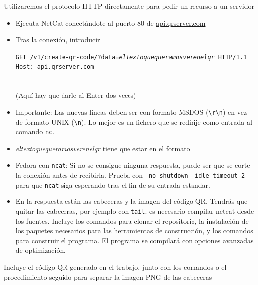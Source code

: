 \begin{homeworkProblem}

  

  
  Utilizaremos el protocolo HTTP directamente para pedir un recurso a un servidor
  \begin{itemize}
  \item Ejecuta NetCat conectándote al puerto 80 de \url{api.qrserver.com}
  \item Tras la conexión, introducir
    \begin{cuadrito}
      \texttt{GET /v1/create-qr-code/?data=\textit{eltextoquequeramosverenelqr} HTTP/1.1} \\
      \texttt{Host: api.qrserver.com} \\
      \\
      \\
      (Aquí hay que darle al Enter dos veces)
    \end{cuadrito}
  \item Importante: Las nuevas líneas deben ser con formato MSDOS (\texttt{\textbackslash r\textbackslash n}) en vez de formato UNIX (\texttt{\textbackslash n}). Lo mejor es un fichero que se redirije como entrada al comando \texttt{nc}.
  \item \textit{eltextoquequeramosverenelqr} tiene que estar en el formato 
  \item Fedora con \texttt{ncat}: Si no se consigue ninguna respuesta, puede ser que se corte la conexión antes de recibirla. Prueba con \texttt{--no-shutdown --idle-timeout 2} para que \texttt{ncat} siga esperando tras el fin de su entrada estándar.
  \item En la respuesta están las cabeceras y la imagen del código QR. Tendrás que quitar las cabeceras, por ejemplo con \texttt{tail}.
      {\noindent\hspace{-100cm}es necesario compilar netcat desde los fuentes. Incluye los comandos para clonar el repositorio, la instalación de los paquetes necesarios para las herramientas de construcción, y los comandos para construir el programa. El programa se compilará con opciones avanzadas de optimización.}

  \end{itemize}

Incluye el código QR generado en el trabajo, junto con los comandos o el procedimiento seguido para separar la imagen PNG de las cabeceras



\end{homeworkProblem}
